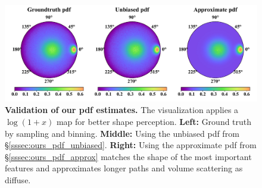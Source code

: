\begin{figure}[t]
	\centering
	\includegraphics[width=\columnwidth]{images/validations/lobe_pdf/pdf.pdf}
	\caption{\textbf{Validation of our pdf estimates.} The visualization applies a $\log(1+x)$ map for better shape perception. \textbf{Left:} Ground truth by sampling and binning. \textbf{Middle:} Using the unbiased pdf from \S\ref{sssec:ours_pdf_unbiased}. \textbf{Right:} Using the approximate pdf from \S\ref{sssec:ours_pdf_approx} matches the shape of the most important features and approximates longer paths and volume scattering as diffuse.}
	\label{fig:pdf-validate}
\end{figure}


